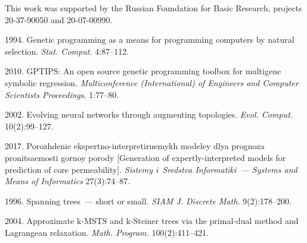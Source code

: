 



\vspace*{-16pt}

\Ack

\vspace*{-3pt}


\noindent
This work was supported by the Russian Foundation for Basic Research, projects 20-37-90050 and 20-07-00990.
  

\vspace*{6pt}

  \begin{multicols}{2}

\renewcommand{\bibname}{\protect\rmfamily References}

{\small\frenchspacing
 {%
 \begin{thebibliography}{99} 

 1994. Genetic programming as a means for programming computers by natural selection. \textit{Stat. Comput.} 4:87--112.

 2010. \mbox{GPTIPS}: An open source genetic programming toolbox for multigene symbolic regression. 
 \textit{Multiconference (International) of Engineers and Computer Scientists Proceedings}. 1:77--80. 

 2002. Evolving neural networks through augmenting topologies. 
\textit{Evol. Comput.} 10(2):99--127.

 2017. Po\-rozh\-de\-nie eks\-pert\-no-inter\-pre\-ti\-ru\-emykh mo\-de\-ley dlya prog\-no\-za pro\-ni\-tsa\-emosti gor\-noy po\-ro\-dy 
 [Generation of expertly-interpreted models for prediction of core permeability]. \textit{Sistemy i~Sredstva Informatiki~--- Systems and Means of Informatics}
  27(3):74--87.

 1996. Spanning trees~--- short or small. \textit{SIAM J. Discrete Math.} 9(2):178--200.

 2004. Approximate k-MSTS and k-Steiner trees via the primal-dual method and Lagrangean relaxation. 
 \textit{Math. Program.} 100(2):411--421.


\end{thebibliography}}}
\end{multicols}
